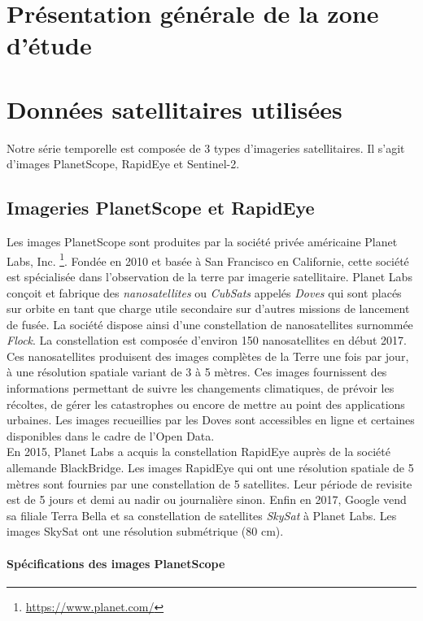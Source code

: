\section{Présentation générale de la zone d'étude}

\section{Données satellitaires utilisées}

Notre série temporelle est composée de 3 types d’imageries satellitaires. Il s'agit d'images PlanetScope, RapidEye et Sentinel-2. 

  \subsection{Imageries PlanetScope et RapidEye}
  
Les images PlanetScope sont produites par la société privée américaine Planet Labs, Inc. \footnote{\url{https://www.planet.com/}}. Fondée en 2010 et basée à San Francisco 
en Californie, cette société est spécialisée dans l'observation de la terre par imagerie satellitaire. Planet Labs conçoit et fabrique des \emph{nanosatellites} ou \emph{CubSats} appelés \emph{Doves}
qui sont placés sur orbite en tant que charge utile secondaire sur d'autres missions de lancement de fusée. La société dispose ainsi d'une constellation de nanosatellites surnommée \emph{Flock}. 
La constellation est composée d'environ 150 nanosatellites en début 2017. Ces nanosatellites produisent des images complètes de la Terre une fois par jour, à une résolution 
spatiale variant de 3 à 5 mètres. Ces images fournissent des informations permettant de suivre les changements climatiques, de prévoir les récoltes, de gérer les catastrophes ou encore de 
mettre au point des applications urbaines. Les images recueillies par les Doves sont accessibles en ligne et certaines disponibles dans le cadre de l'Open Data. \\
En 2015, Planet Labs a acquis la constellation RapidEye auprès de la société allemande BlackBridge. Les images RapidEye qui ont une résolution spatiale de 5 mètres sont fournies par une 
constellation de 5 satellites. Leur période de revisite est de 5 jours et demi au nadir ou journalière sinon. Enfin en 2017, Google vend sa filiale Terra Bella et sa constellation de 
satellites \emph{SkySat} à Planet Labs. Les images SkySat ont une résolution submétrique (80 cm). 

    \paragraph{Spécifications des images PlanetScope}

